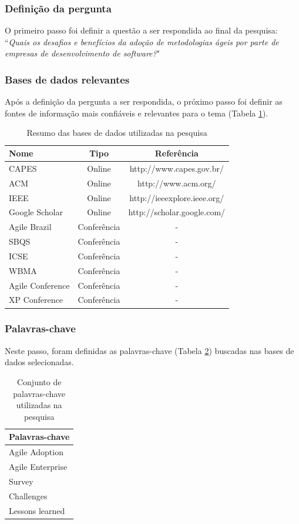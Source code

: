 \documentclass[a4paper,11pt]{article}
\begin{document}
		\subsubsection{Definição da pergunta}
			O primeiro passo foi definir a questão a ser respondida ao final da pesquisa: ``\textit{Quais os desafios e benefícios da adoção de metodologias ágeis por parte de empresas de desenvolvimento de software?}"
		\subsubsection{Bases de dados relevantes}
			Após a definição da pergunta a ser respondida, o próximo passo foi definir as fontes de informação mais confiáveis e relevantes para o tema (Tabela \ref{tab:basesDeDados}).
			\begin{table}[H]
				\centering
				\begin{tabular}{ | l | c | c | } \hline \textbf{Nome} & \textbf{Tipo} & \textbf{Referência} \\ \hline
					CAPES & Online & http://www.capes.gov.br/ \\ \hline
					ACM & Online & http://www.acm.org/ \\ \hline
					IEEE & Online & http://ieeexplore.ieee.org/ \\ \hline
					Google Scholar & Online & http://scholar.google.com/ \\ \hline
					Agile Brazil & Conferência & - \\ \hline
					SBQS & Conferência & - \\ \hline
					ICSE & Conferência & - \\ \hline
					WBMA & Conferência & - \\ \hline
					Agile Conference & Conferência & - \\ \hline
					XP Conference & Conferência & - \\ \hline
				\end{tabular}
				\caption{Resumo das bases de dados utilizadas na pesquisa}
				\label{tab:basesDeDados}
			\end{table}
		\subsubsection{Palavras-chave}
			Neste passo, foram definidas as palavras-chave (Tabela \ref{tab:palavrasChave}) buscadas nas bases de dados selecionadas.
			\begin{table}[H]
				\centering
				\begin{tabular}{ | l | } \hline \textbf{Palavras-chave} \\ \hline
					Agile Adoption \\ \hline
					Agile Enterprise \\ \hline
					Survey \\ \hline
					Challenges \\ \hline
					Lessons learned \\ \hline
				\end{tabular}
				\caption{Conjunto de palavras-chave utilizadas na pesquisa}
				\label{tab:palavrasChave}
			\end{table}
\end{document}
